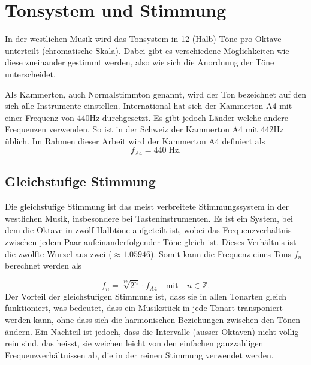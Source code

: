 %
%
%
%
\section{Tonsystem und Stimmung
\label{autotune:section:tonsystemUndStimmung}}
In der westlichen Musik wird das Tonsystem in 12 (Halb)-Töne pro Oktave unterteilt (chromatische Skala).
%
%
Dabei gibt es verschiedene Möglichkeiten wie diese zueinander gestimmt werden, also wie sich die Anordnung der Töne unterscheidet.

Als Kammerton, auch Normalstimmton genannt, wird der Ton bezeichnet auf den sich alle Instrumente einstellen.
%
%
International hat sich der Kammerton A4 mit einer Frequenz von 440\;Hz durchgesetzt.
Es gibt jedoch Länder welche andere Frequenzen verwenden.
So ist in der Schweiz der Kammerton A4 mit 442\;Hz üblich.
Im Rahmen dieser Arbeit wird der Kammerton A4 definiert als 
\begin{equation}
    f_{A4}
    =
    440\;\text{Hz}.
\end{equation}

\subsection{Gleichstufige Stimmung
\label{autotune:subsection:gleichstuffigeStimmung}}
Die gleichstufige Stimmung ist das meist verbreitete Stimmungssystem in der westlichen Musik, insbesondere bei Tasteninstrumenten.
%
%
Es ist ein System, bei dem die Oktave in zwölf Halbtöne aufgeteilt ist,
wobei das Frequenzverhältnis zwischen jedem Paar aufeinanderfolgender Töne gleich ist.
Dieses Verhältnis ist die zwölfte Wurzel aus zwei ($\approx 1.05946$). Somit kann die Frequenz eines Tons $f_n$ berechnet werden als
%

\begin{equation}
    f_n
    =
    \sqrt[12]{2^n} \cdot f_{A4}
    \quad \text{mit} \quad
    n \in \mathbb{Z}.
\end{equation}
Der Vorteil der gleichstufigen Stimmung ist, dass sie in allen Tonarten gleich funktioniert, was bedeutet,
dass ein Musikstück in jede Tonart transponiert werden kann, ohne dass sich die harmonischen Beziehungen zwischen den Tönen ändern.
Ein Nachteil ist jedoch, dass die Intervalle (ausser Oktaven) nicht völlig rein sind, das heisst,
sie weichen leicht von den einfachen ganzzahligen Frequenzverhältnissen ab, die in der reinen Stimmung verwendet werden.

